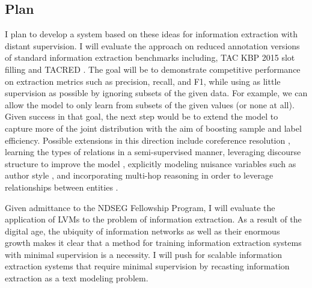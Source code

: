 \documentclass[12pt]{article}
\begin{document}
\subsection*{Plan}

I plan to develop a system based on these ideas for information extraction with distant supervision. I will evaluate the approach on reduced annotation versions of standard information extraction benchmarks including, TAC KBP 2015 slot filling and  TACRED \citep{zhang2017slotfilling}.
The goal will be to demonstrate competitive performance on
extraction metrics such as precision, recall, and F1, while using as little supervision
as possible by ignoring subsets of the given data.
For example, we can allow the model to only learn from
subsets of the given values (or none at all).
Given success in that goal, the next step would be to extend the model
to capture more of the joint distribution with the aim of boosting sample and label efficiency.
Possible extensions in this direction include coreference resolution \citep{haghighi2010coref},
learning the types of relations in a semi-supervised manner,
leveraging discourse structure to improve the model
\citep{sauper2009wiki}, explicitly modeling nuisance variables such as
author style \citep{hsu2017speech}, and incorporating multi-hop
reasoning in order to leverage relationships between entities
\citep{chen2018diva,rock17prove}.

Given admittance to the NDSEG Fellowship Program, I will evaluate the application of
LVMs to the problem of information extraction.
As a result of the digital age, the ubiquity of information networks as well as their 
enormous growth makes it clear that a method for training information extraction systems
with minimal supervision is a necessity.
I will push for scalable information extraction systems that require minimal supervision
by recasting information extraction as a text modeling problem.
\end{document}
